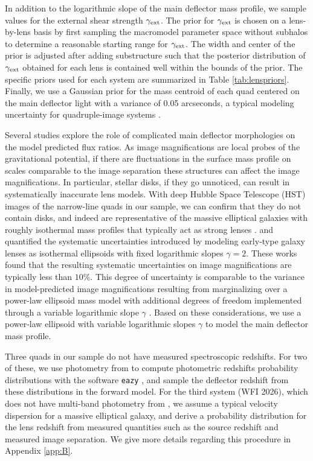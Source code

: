 In addition to the logarithmic slope of the main deflector mass profile, we sample values for the external shear strength $\gamma_{\rm{ext}}$. The prior for $\gamma_{\rm{ext}}$ is chosen on a lens-by-lens basis by first sampling the macromodel parameter space without subhalos to determine a reasonable starting range for $\gamma_{\rm{ext}}$. The width and center of the prior is adjusted after adding substructure such that the posterior distribution of $\gamma_{\rm{ext}}$ obtained for each lens is contained well within the bounds of the prior. The specific priors used for each system are summarized in Table \ref{tab:lenspriors}. Finally, we use a Gaussian prior for the mass centroid of each quad centered on the main deflector light with a variance of 0.05 arcseconds, a typical modeling uncertainty for quadruple-image systems \citep{Shajib++18, Nierenberg++19}. 

Several studies \citep{EvansWitt03,Hsueh++16,Gilman++17,Hsueh++17,Hsueh++18} explore the role of complicated main deflector morphologies on the model predicted flux ratios. As image magnifications are local probes of the gravitational potential, if there are fluctuations in the surface mass profile on scales comparable to the image separation these structures can affect the image magnifications. In particular, stellar disks, if they go unnoticed, can result in systematically inaccurate lens models. With deep Hubble Space Telescope (HST) images of the narrow-line quads in our sample, we can confirm that they do not contain disks, and indeed are representative of the massive elliptical galaxies with roughly isothermal mass profiles that typically act as strong lenses \citep{Auger++10,Shankar++17}. \citet{Gilman++17} and \citet{Hsueh++18} quantified the systematic uncertainties introduced by modeling early-type galaxy lenses as isothermal ellipsoids with fixed logarithmic slopes $\gamma = 2$. These works found that the resulting systematic uncertainties on image magnifications are typically less than $10\%$. This degree of uncertainty is comparable to the variance in model-predicted image magnifications resulting from marginalizing over a power-law ellipsoid mass model with additional degrees of freedom implemented through a variable logarithmic slope $\gamma$ \citep{Nierenberg++19}. Based on these considerations, we use a power-law ellipsoid with variable logarithmic slopes $\gamma$ to model the main deflector mass profile.

Three quads in our sample do not have measured spectroscopic redshifts. For two of these, we use photometry from \citet{Shajib++18} to compute photometric redshifts probability distributions with the software {\tt{eazy}} \citep{Brammer++08}, and sample the deflector redshift from these distributions in the forward model. For the third system (WFI 2026), which does not have multi-band photometry from \citet{Shajib++18}, we assume a typical velocity dispersion for a massive elliptical galaxy, and derive a probability distribution for the lens redshift from measured quantities such as the source redshift and measured image separation. We give more details regarding this procedure in Appendix \ref{app:B}.    

